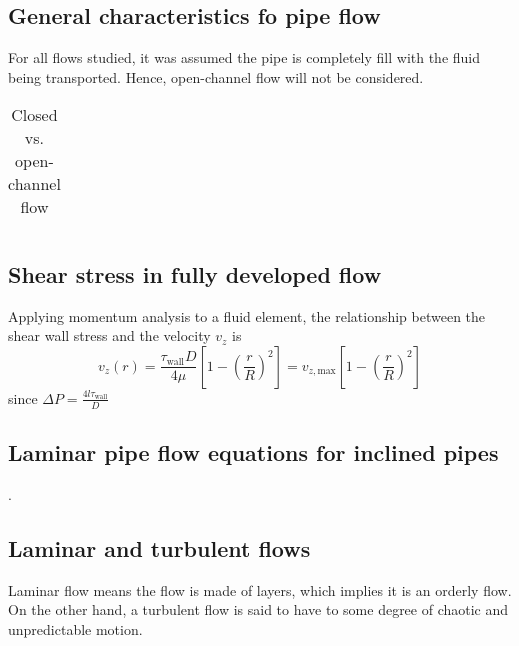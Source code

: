 \documentclass[10pt, twocolumn]{article}
\begin{document}
\subsection{General characteristics fo pipe flow}
For all flows studied, it was assumed the pipe is completely fill with the fluid being transported.
Hence, open-channel flow will not be considered.

\begin{table}[ht] %
  \caption{Closed vs. open-channel flow}
  \label{tab:table-reference}
  \centering %
  \begin{tabular}{ %
      r r
    }

    \toprule %
    \\
    \midrule %

    \bottomrule
  \end{tabular}
\end{table}



\subsection{Shear stress in fully developed flow}
Applying momentum analysis to a fluid element, the relationship between the shear wall stress and the velocity \(v_z\) is
\[
  v_z(r) = \frac{\tau_\mathrm{wall}D}{4\mu} \left[ 1 - \left( \frac{r}{R} \right)^2 \right] = v_{z,\mathrm{max}} \left[ 1 - \left( \frac{r}{R} \right)^2 \right]
\]
since \(\Delta P = \frac{4 l \tau_\mathrm{wall}}{D}\)


\subsection{Laminar pipe flow equations for inclined pipes}.


\subsection{Laminar and turbulent flows}
Laminar flow means the flow is made of layers, which implies it is an orderly flow.
On the other hand, a turbulent flow is said to have to some degree of chaotic and unpredictable motion.
\end{document}
